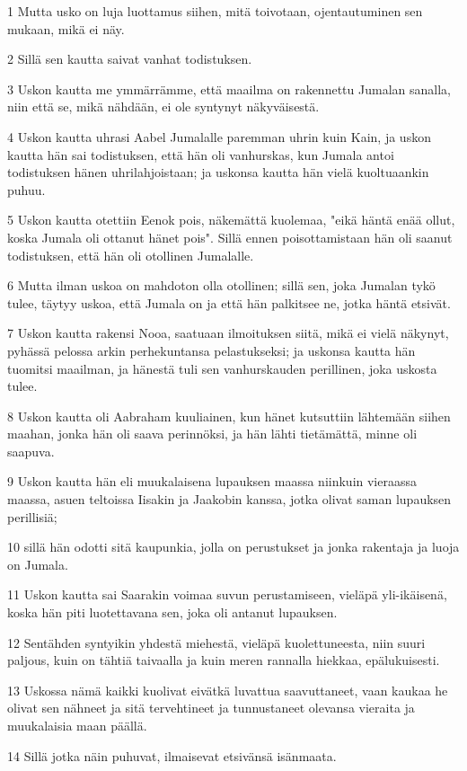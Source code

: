 \par 1 Mutta usko on luja luottamus siihen, mitä toivotaan, ojentautuminen sen mukaan, mikä ei näy.
\par 2 Sillä sen kautta saivat vanhat todistuksen.
\par 3 Uskon kautta me ymmärrämme, että maailma on rakennettu Jumalan sanalla, niin että se, mikä nähdään, ei ole syntynyt näkyväisestä.
\par 4 Uskon kautta uhrasi Aabel Jumalalle paremman uhrin kuin Kain, ja uskon kautta hän sai todistuksen, että hän oli vanhurskas, kun Jumala antoi todistuksen hänen uhrilahjoistaan; ja uskonsa kautta hän vielä kuoltuaankin puhuu.
\par 5 Uskon kautta otettiin Eenok pois, näkemättä kuolemaa, "eikä häntä enää ollut, koska Jumala oli ottanut hänet pois". Sillä ennen poisottamistaan hän oli saanut todistuksen, että hän oli otollinen Jumalalle.
\par 6 Mutta ilman uskoa on mahdoton olla otollinen; sillä sen, joka Jumalan tykö tulee, täytyy uskoa, että Jumala on ja että hän palkitsee ne, jotka häntä etsivät.
\par 7 Uskon kautta rakensi Nooa, saatuaan ilmoituksen siitä, mikä ei vielä näkynyt, pyhässä pelossa arkin perhekuntansa pelastukseksi; ja uskonsa kautta hän tuomitsi maailman, ja hänestä tuli sen vanhurskauden perillinen, joka uskosta tulee.
\par 8 Uskon kautta oli Aabraham kuuliainen, kun hänet kutsuttiin lähtemään siihen maahan, jonka hän oli saava perinnöksi, ja hän lähti tietämättä, minne oli saapuva.
\par 9 Uskon kautta hän eli muukalaisena lupauksen maassa niinkuin vieraassa maassa, asuen teltoissa Iisakin ja Jaakobin kanssa, jotka olivat saman lupauksen perillisiä;
\par 10 sillä hän odotti sitä kaupunkia, jolla on perustukset ja jonka rakentaja ja luoja on Jumala.
\par 11 Uskon kautta sai Saarakin voimaa suvun perustamiseen, vieläpä yli-ikäisenä, koska hän piti luotettavana sen, joka oli antanut lupauksen.
\par 12 Sentähden syntyikin yhdestä miehestä, vieläpä kuolettuneesta, niin suuri paljous, kuin on tähtiä taivaalla ja kuin meren rannalla hiekkaa, epälukuisesti.
\par 13 Uskossa nämä kaikki kuolivat eivätkä luvattua saavuttaneet, vaan kaukaa he olivat sen nähneet ja sitä tervehtineet ja tunnustaneet olevansa vieraita ja muukalaisia maan päällä.
\par 14 Sillä jotka näin puhuvat, ilmaisevat etsivänsä isänmaata.
